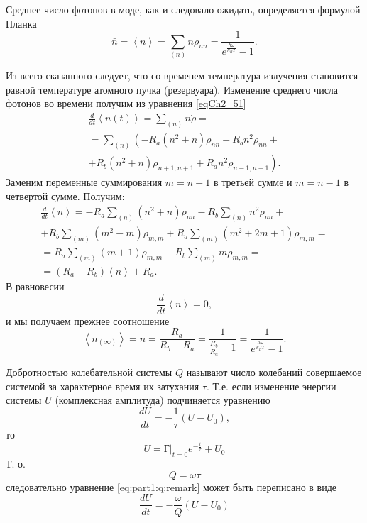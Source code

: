 Среднее число фотонов в моде, как и следовало ожидать, определяется
формулой Планка 
\begin{equation}
\bar{n} = \left<n\right> = 
\sum_{(n)} n \rho_{nn} = 
\frac{1}{ e^{\frac{\hbar \omega}{k_B T}} - 1}.
\end{equation}

Из всего сказанного следует, что со временем температура излучения
становится равной температуре атомного пучка (резервуара).  
Изменение среднего числа фотонов во времени получим из уравнения 
\eqref{eqCh2_51}
\begin{eqnarray}
\frac{d}{d t}\left<n\left(t\right)\right> = \sum_{(n)}n \dot{\rho} = 
\nonumber \\
= \sum_{(n)}\left(-R_a\left(n^2 + n\right)\rho_{nn} - R_b n^2
\rho_{nn} + \right.
\nonumber \\
+ \left.
R_b \left(n^2 + n\right) \rho_{n +1, n+ 1} +
R_a n^2 \rho_{n - 1, n - 1}
\right).
\end{eqnarray}
Заменим переменные суммирования  $m= n + 1$  в третьей сумме и  $m = n
- 1$  в четвертой сумме. Получим:
\begin{eqnarray}
\frac{d}{d t}\left<n\right> = 
-R_a \sum_{(n)}\left(n^2 + n\right)\rho_{nn}
 - R_b \sum_{(n)} n^2 \rho_{nn} +
\nonumber \\
+ R_b\sum_{(m)}\left(m^2 - m\right)\rho_{m,m} 
+ R_a\sum_{(m)}\left(m^2 +2 m + 1\right)\rho_{m,m} = 
\nonumber \\
= R_a \sum_{(m)}\left( m + 1\right)\rho_{m,m} - R_b\sum_{(m)} m
\rho_{m,m} =
\nonumber \\
= \left(R_a - R_b\right) \left<n\right> + R_a.
\label{eqCh2_57}
\end{eqnarray}
В равновесии
\[
\frac{d}{d t}\left<n\right> = 0,
\]  
и мы получаем прежнее соотношение
\begin{equation}
\left<n_{(\infty)}\right> = \bar{n} = 
\frac{R_a}{R_b - R_a} = \frac{1}{\frac{R_b}{R_a} - 1} = 
\frac{1}{e^{\frac{\hbar \omega}{k_B T}} - 1}.
\end{equation}

\begin{definition}[Добротность]
\label{def:Qfactor}
Добротностью колебательной системы $Q$ называют \cite{bKarlov2003} число колебаний
совершаемое системой за характерное время их затухания $\tau$. Т.е. если
изменение энергии системы $U$ (комплексная амплитуда) подчиняется уравнению
\begin{equation}
\label{eq:part1:q:remark}
\frac{d U}{d t} = - \frac{1}{\tau} \left(U - U_0\right),
\end{equation}
то
\[
U = \left.Г\right|_{t=0} e^{-\frac{t}{\tau}} + U_0
\]
Т. о. 
\[
Q = \omega \tau
\]
следовательно уравнение \eqref{eq:part1:q:remark} может быть
переписано в виде 
\[
\frac{d U}{d t} = - \frac{\omega}{Q} \left(U-U_0\right)
\]
\end{definition}


